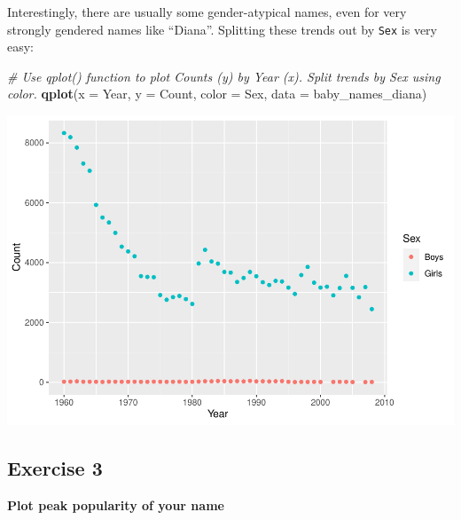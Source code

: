 \documentclass[
]{book}
\newenvironment{Shaded}{\begin{snugshade}}{\end{snugshade}}
\newcommand{\CommentTok}[1]{\textcolor[rgb]{0.56,0.35,0.01}{\textit{#1}}}
\newcommand{\DataTypeTok}[1]{\textcolor[rgb]{0.13,0.29,0.53}{#1}}
\newcommand{\KeywordTok}[1]{\textcolor[rgb]{0.13,0.29,0.53}{\textbf{#1}}}
\newcommand{\NormalTok}[1]{#1}
\begin{document}
Interestingly, there are usually some gender-atypical names, even for very strongly
gendered names like ``Diana''. Splitting these trends out by \texttt{Sex} is very easy:

\begin{Shaded}
\begin{Highlighting}[]
\CommentTok{\# Use qplot() function to plot Counts (y) by Year (x). Split trends by Sex using color.}
\KeywordTok{qplot}\NormalTok{(}\DataTypeTok{x =}\NormalTok{ Year, }\DataTypeTok{y =}\NormalTok{ Count, }\DataTypeTok{color =}\NormalTok{ Sex,}
      \DataTypeTok{data =}\NormalTok{ baby\_names\_diana)}
\end{Highlighting}
\end{Shaded}

\includegraphics{R/Rintro/figures/unnamed-chunk-43-1.pdf}

\hypertarget{exercise-3}{%
\subsection{Exercise 3}\label{exercise-3}}

\textbf{Plot peak popularity of your name}
\end{document}
